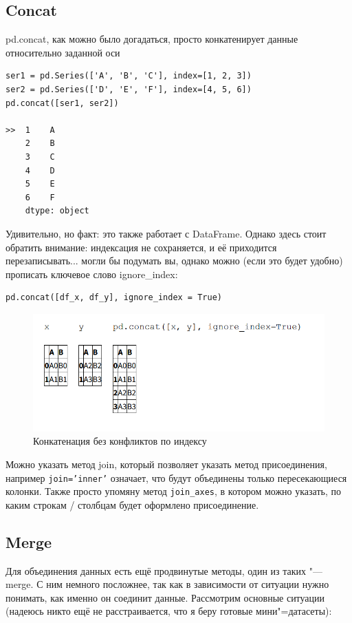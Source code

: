\documentclass{article}
\begin{document}
\subsection*{Concat}
pd.concat, как можно было догадаться, просто конкатенирует данные относительно заданной оси 
\begin{verbatim}
ser1 = pd.Series(['A', 'B', 'C'], index=[1, 2, 3])
ser2 = pd.Series(['D', 'E', 'F'], index=[4, 5, 6])
pd.concat([ser1, ser2])

>>  1    A
    2    B
    3    C
    4    D
    5    E
    6    F
    dtype: object
\end{verbatim}
Удивительно, но факт: это также работает с DataFrame. Однако здесь стоит обратить внимание:
индексация не сохраняется, и её приходится перезаписывать... могли бы подумать вы, однако можно (если это будет удобно) прописать ключевое слово ignore\_index:
\begin{verbatim}
pd.concat([df_x, df_y], ignore_index = True)
\end{verbatim}

\begin{figure}[H]
    \centering
    \includegraphics[width=0.65\linewidth]{concat_index.png}
    \caption{Конкатенация без конфликтов по индексу}
    \label{fig:enter-label}
\end{figure}

Можно указать метод join, который позволяет указать метод присоединения, например \texttt{join='inner'} означает, что будут объединены только пересекающиеся колонки. Также просто упомяну метод \texttt{join_axes}, в котором можно указать, по каким строкам / столбцам будет оформлено присоединение.


\subsection*{Merge}
Для объединения данных есть ещё продвинутые методы, один из таких "--- merge. С ним немного посложнее, так как в зависимости от ситуации нужно понимать, как именно он соединит данные. Рассмотрим основные ситуации (надеюсь никто ещё не расстраивается, что я беру готовые мини"=датасеты):
\end{document}
